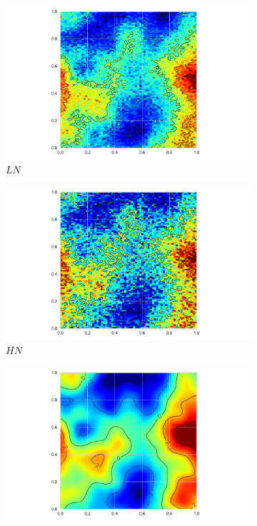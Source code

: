 \begin{figure}
	\centering
	\begin{subfigure}[b]{0.45\textwidth}
		\includegraphics[width=\textwidth]{sim_noise_example_lin}
		\caption{$LN$}
		\label{fig:ftsm_noise_example_0}
	\end{subfigure}             
	\begin{subfigure}[b]{0.45\textwidth}
		\includegraphics[width=\textwidth]{sim_noise_example_hin}
		\caption{$HN$}
	\end{subfigure}
	\vfill       
	\begin{subfigure}[b]{0.45\textwidth}
		\includegraphics[width=\textwidth]{sim_noise_example_lsn}

\end{subfigure}
\end{figure}
